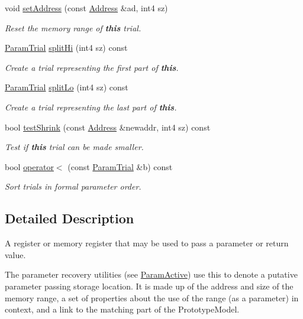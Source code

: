 \begin{DoxyCompactItemize}
void \mbox{\hyperlink{class_param_trial_ad7ca7f738c822caea264fb6bf7b2738d}{set\+Address}} (const \mbox{\hyperlink{class_address}{Address}} \&ad, int4 sz)
\begin{DoxyCompactList}\small\item\em Reset the memory range of {\bfseries{this}} trial. \end{DoxyCompactList}\item 
\mbox{\hyperlink{class_param_trial}{Param\+Trial}} \mbox{\hyperlink{class_param_trial_a59648aa757130b4607ec1c18926ff234}{split\+Hi}} (int4 sz) const
\begin{DoxyCompactList}\small\item\em Create a trial representing the first part of {\bfseries{this}}. \end{DoxyCompactList}\item 
\mbox{\hyperlink{class_param_trial}{Param\+Trial}} \mbox{\hyperlink{class_param_trial_a28244bdb2c9f412028e2ac390921cfa0}{split\+Lo}} (int4 sz) const
\begin{DoxyCompactList}\small\item\em Create a trial representing the last part of {\bfseries{this}}. \end{DoxyCompactList}\item 
bool \mbox{\hyperlink{class_param_trial_a4bbb238263015249f040a7309e9335a6}{test\+Shrink}} (const \mbox{\hyperlink{class_address}{Address}} \&newaddr, int4 sz) const
\begin{DoxyCompactList}\small\item\em Test if {\bfseries{this}} trial can be made smaller. \end{DoxyCompactList}\item 
bool \mbox{\hyperlink{class_param_trial_ac234b0e0b800d4319bc212dd2eb088d8}{operator$<$}} (const \mbox{\hyperlink{class_param_trial}{Param\+Trial}} \&b) const
\begin{DoxyCompactList}\small\item\em Sort trials in formal parameter order. \end{DoxyCompactList}\end{DoxyCompactItemize}


\subsection{Detailed Description}
A register or memory register that may be used to pass a parameter or return value. 

The parameter recovery utilities (see \mbox{\hyperlink{class_param_active}{Param\+Active}}) use this to denote a putative parameter passing storage location. It is made up of the address and size of the memory range, a set of properties about the use of the range (as a parameter) in context, and a link to the matching part of the Prototype\+Model.

